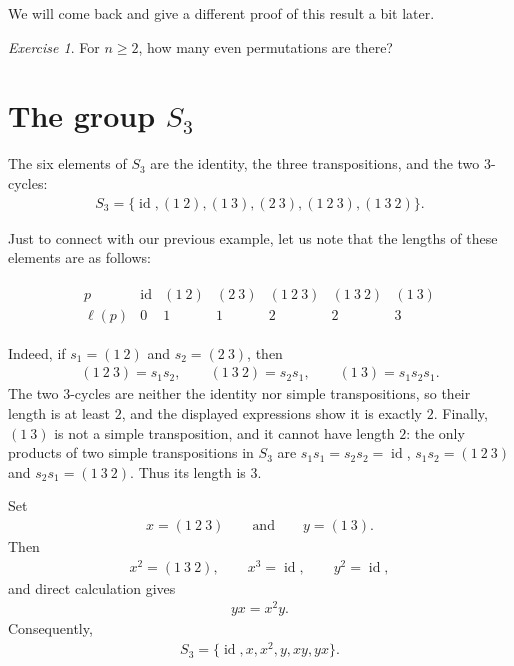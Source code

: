 \documentclass[reqno,11pt]{amsart}
\theoremstyle{definition}
\theoremstyle{plain}
\theoremstyle{remark}
\newtheorem{exercise}[theorem]{Exercise}
\numberwithin{equation}{section}
\newcommand{\id}{\operatorname{id}}
\newcommand{\be}{\begin{eqnarray}}
\newcommand{\ee}{\end{eqnarray}}
\begin{document}
We will come back and give a different proof of this result a bit later.

\begin{exercise}For $n\geq2$, how many even permutations are there? \end{exercise}

\section{The group \texorpdfstring{$S_3$}{S3}}

The six elements of $S_3$ are the identity, the three transpositions, and the
two $3$-cycles:
\be
S_3=\{\id,(1\ 2),(1\ 3),(2\ 3),(1\ 2\ 3),(1\ 3\ 2)\}.
\ee

Just to connect with our previous example, let us note that the lengths of these elements are as follows:

\be
\begin{array}{c|cccccc}
	p & \id & (1\ 2) & (2\ 3) & (1\ 2\ 3) & (1\ 3\ 2) & (1\ 3) \\ \hline
	\ell(p) & 0 & 1 & 1 & 2 & 2 & 3
\end{array}
\ee

Indeed, if $s_1=(1\ 2)$ and $s_2=(2\ 3)$, then
\be
(1\ 2\ 3)=s_1s_2,
\qquad
(1\ 3\ 2)=s_2s_1,
\qquad
(1\ 3)=s_1s_2s_1.
\ee
The two $3$-cycles are neither the identity nor simple transpositions, so
their length is at least $2$, and the displayed expressions show it is exactly $2$. Finally, $(1\ 3)$ is not a simple transposition, and it
cannot have length $2$: the only products of two simple transpositions in $S_3$ are $s_1s_1=s_2s_2=\id$, $s_1s_2=(1\ 2\ 3)$ and $s_2s_1=(1\ 3\ 2)$. Thus its
length is $3$.



Set
\be
x=(1\ 2\ 3)
\qquad\text{and}\qquad
y=(1\ 3).
\ee
Then
\be
x^2=(1\ 3\ 2),
\qquad x^3=\id,
\qquad y^2=\id,
\ee
and direct calculation gives
\be
yx=x^2y.
\ee
Consequently,
\be
S_3=\{\id,x,x^2,y,xy,yx\}.
\ee
\end{document}
